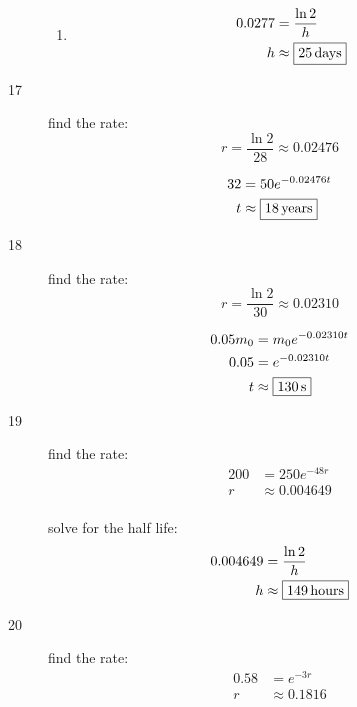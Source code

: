 \documentclass{exam}
\begin{document}
\begin{description}
\begin{enumerate}[a]
          \item
            \begin{align*}
              0.0277 & = \frac{\ln 2}{h} \\
              h      & \approx \boxed{\unit[25]{days}} \\
            \end{align*}
        \end{enumerate}

      \item[17]
        find the rate: 
        \[
          r = \frac{\ln 2}{28} \approx 0.02476
        \]

        \begin{align*}
          32 & = 50 e^{-0.02476 t} \\
          t  & \approx \boxed{\unit[18]{years}} \\
        \end{align*}

      \item[18]
        find the rate: 
        \[
          r = \frac{\ln 2}{30} \approx 0.02310
        \]

        \begin{align*}
          0.05m_0 & = m_0 e^{-0.02310 t} \\
          0.05    & =  e^{-0.02310 t} \\
          t       & \approx \boxed{\unit[130]{s}} \\
        \end{align*}

      \item[19]
        find the rate:
        \begin{align*}
          200 & = 250 e^{-48r} \\
          r   & \approx 0.004649 \\
        \end{align*}

        solve for the half life:
        \begin{align*}
          0.004649 & = \frac{\ln 2}{h} \\
          h        & \approx \boxed{\unit[149]{hours}} \\
        \end{align*}

      \item[20]
        find the rate:
        \begin{align*}
          0.58 & = e^{-3r} \\
          r    & \approx 0.1816 \\
        \end{align*}


\end{description}
\end{document}
